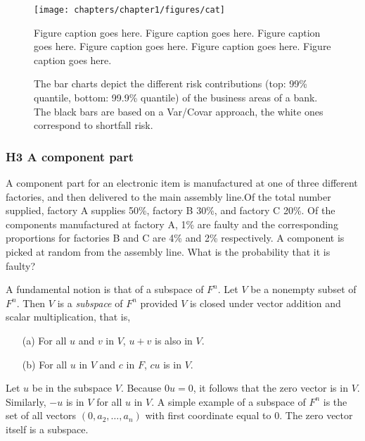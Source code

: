 \begin{figure}[htb]
\texttt{[image: chapters/chapter1/figures/cat]}
\caption[Short figure caption]{Figure caption goes here. Figure caption goes here.
Figure caption goes here. Figure caption goes here. Figure caption goes here.
Figure caption goes here.}
\end{figure}





\begin{figure}
\begin{center}
\end{center}
\caption[The bar charts depict the different risk contributions]{The bar charts depict the different risk contributions (top: 99\% quantile, bottom: 99.9\% quantile) of the business areas of a bank. The black bars
are based on a Var/Covar approach, the white ones correspond to shortfall risk.}
\end{figure}

\subsubsection{H3 A component part }
A component part for an electronic item is
manufactured at one of three \cite{mardia1979ma} different factories, and then delivered to
the main assembly line.Of the total number supplied, factory A supplies
50\%, factory B 30\%, and factory C 20\%. Of the components
manufactured at factory A, 1\% are faulty and the corresponding
proportions for factories B and C are 4\% and 2\% respectively. A
component is picked at random from the assembly line. What is the
probability that it is faulty?


A fundamental notion \cite{yao2002can} is that of a subspace of $F^n$. Let $V$ be a nonempty subset of
$F^n$. Then $V$ is a {\it subspace} of $F^n$ provided $V$ is closed
under vector addition and scalar multiplication, that is,
\begin{enumerate}
\item[\rm (a)] For all $u$ and $v$ in $V$, $u+v$ is
also in $V$.
\item[\rm (b)] For all $u$ in $V$ and $c$ in $F$, $cu$ is
in $V$.
\end{enumerate}
Let $u$ be in the subspace $V$. Because $0u=0$,
it follows that the zero vector is in $V$. Similarly, $-u$ is in $V$
for all $u$ in $V$. A simple example of a subspace of $F^n$ is the set
of all vectors $(0,a_2,\ldots,a_n)$ with first coordinate equal to 0.
The zero vector itself is a subspace.

